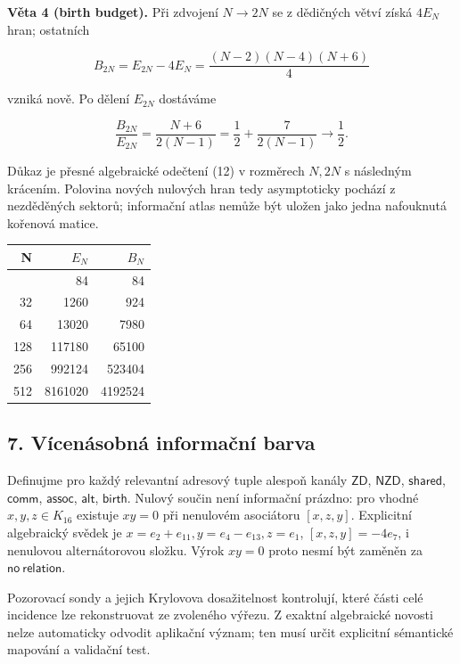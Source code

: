 \documentclass[
  10pt,
]{article}
\begin{document}
\textbf{Věta 4 (birth budget).} Při zdvojení \(N\to2N\) se z dědičných
větví získá \(4E_N\) hran; ostatních

\[
B_{2N}=E_{2N}-4E_N=\frac{(N-2)(N-4)(N+6)}4
\tag{13}
\]

vzniká nově. Po dělení \(E_{2N}\) dostáváme

\[
\frac{B_{2N}}{E_{2N}}=\frac{N+6}{2(N-1)}=\frac12+\frac7{2(N-1)}\longrightarrow\frac12.
\tag{14}
\]

Důkaz je přesné algebraické odečtení (12) v rozměrech \(N,2N\) s
následným krácením. Polovina nových nulových hran tedy asymptoticky
pochází z nezděděných sektorů; informační atlas nemůže být uložen jako
jedna nafouknutá kořenová matice.

\begin{longtable}[]{@{}rrr@{}}
\toprule\noalign{}
N & \(E_N\) & \(B_N\) \\
\midrule\noalign{}
\endhead
\bottomrule\noalign{}
\endlastfoot
16 & 84 & 84 \\
32 & 1260 & 924 \\
64 & 13020 & 7980 \\
128 & 117180 & 65100 \\
256 & 992124 & 523404 \\
512 & 8161020 & 4192524 \\
\end{longtable}

\subsection{7. Vícenásobná informační
barva}\label{vuxedcenuxe1sobnuxe1-informaux10dnuxed-barva}

Definujme pro každý relevantní adresový tuple alespoň kanály
\(\mathsf{ZD}\), \(\mathsf{NZD}\), \(\mathsf{shared}\),
\(\mathsf{comm}\), \(\mathsf{assoc}\), \(\mathsf{alt}\),
\(\mathsf{birth}\). Nulový součin není informační prázdno: pro vhodné
\(x,y,z\in K_{16}\) existuje \(xy=0\) při nenulovém asociátoru
\([x,z,y]\). Explicitní algebraický svědek je
\(x=e_2+e_{11}, y=e_4-e_{13}, z=e_1\), \([x,z,y]=-4e_7\), i nenulovou
alternátorovou složku. Výrok \(xy=0\) proto nesmí být zaměněn za
\(\mathsf{no\ relation}\).

Pozorovací sondy a jejich Krylovova dosažitelnost kontrolují, které
části celé incidence lze rekonstruovat ze zvoleného výřezu. Z exaktní
algebraické novosti nelze automaticky odvodit aplikační význam; ten musí
určit explicitní sémantické mapování a validační test.
\end{document}
